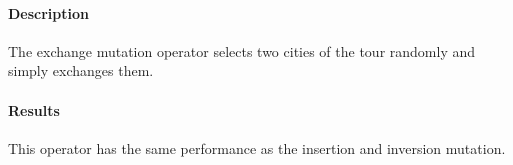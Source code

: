\documentclass[a4paper,english,11pt,]{scrartcl}
\begin{document}
\paragraph{Description}
The exchange mutation operator selects two cities of the tour randomly and simply exchanges them. 


\paragraph{Results}
This operator has the same performance as the insertion and inversion mutation.

% 







% 
\end{document}

